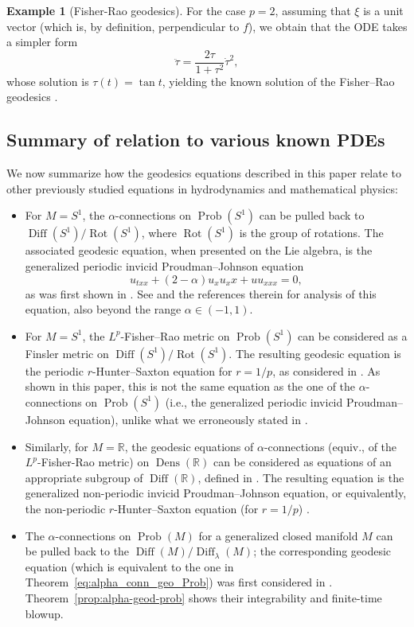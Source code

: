 \documentclass[11pt]{amsart}
\theoremstyle{definition}
\newtheorem{example}[theorem]{Example}
\newcommand{\R}{\mathbb R}
\newcommand{\dx}{\lambda}
\newcommand{\Diff}{\operatorname{Diff}(M)}
\newcommand{\SDiff}{\operatorname{Diff}_{\dx}(M)}
\begin{document}
\begin{example}[Fisher-Rao geodesics]
For the case $p=2$, assuming that $\xi$ is a unit vector (which is, by definition, perpendicular to $f$), we obtain that the ODE takes a simpler form
\[
\ddot\tau = \frac{2\tau}{1+\tau^2}\dot\tau^2,
\]
whose solution is $\tau(t) = \tan t$, yielding the known solution of the Fisher--Rao geodesics \cite[Remark~4.4]{khesin2013geometry}. 
\end{example}

\subsection{Summary of relation to various known PDEs}\label{sec:PDEs}
We now summarize how the geodesics equations described in this paper relate to other previously studied equations in hydrodynamics and mathematical physics:
\begin{itemize}
\item For $M=S^1$, the $\alpha$-connections on $\operatorname{Prob}(S^1)$ can be pulled back to $\operatorname{Diff}(S^1)/\operatorname{Rot}(S^1)$, where $\operatorname{Rot}(S^1)$ is the group of rotations.
The associated geodesic equation, when presented on the Lie algebra, is the generalized periodic invicid Proudman--Johnson equation 
\[
u_{txx}+(2-\alpha)u_xu_xx + uu_{xxx} = 0,
\]
as was first shown in \cite{lenells2014amari}.
See \cite{sarria2013blow,kogelbauer2020global} and the references therein for analysis of this equation, also beyond the range $\alpha \in (-1,1)$.
\item For $M=S^1$, the $L^p$-Fisher--Rao metric on $\operatorname{Prob}(S^1)$ can be considered as a Finsler metric on $\operatorname{Diff}(S^1)/\operatorname{Rot}(S^1)$.
The resulting geodesic equation is the periodic $r$-Hunter--Saxton equation for $r=1/p$, as considered in \cite{cotter2020r,bauer2022geometric}.
As shown in this paper, this is not the same equation as the one of the $\alpha$-connections on $\operatorname{Prob}(S^1)$ (i.e., the generalized periodic invicid Proudman--Johnson equation), unlike what we erroneously stated in \cite{bauer2022geometric}. 
\item Similarly, for $M = \R$, the geodesic equations of $\alpha$-connections (equiv., of the $L^p$-Fisher-Rao metric) on $\operatorname{Dens}(\R)$ can be considered as equations of an appropriate subgroup of $\operatorname{Diff}(\R)$, defined in \cite{bauer2022geometric}.
The resulting equation is the generalized non-periodic invicid Proudman--Johnson equation, or equivalently, the non-periodic $r$-Hunter--Saxton equation (for $r = 1/p$) \cite{cotter2020r}.
\item The $\alpha$-connections on $\operatorname{Prob}(M)$ for a generalized closed manifold $M$ can be pulled back to the $\Diff/\SDiff$; the corresponding geodesic equation (which is equivalent to the one in Theorem~\ref{eq:alpha_conn_geo_Prob}) was first considered in \cite{lenells2014amari}.
Theorem~\ref{prop:alpha-geod-prob} shows their integrability and finite-time blowup.
\end{itemize}
\end{document}

